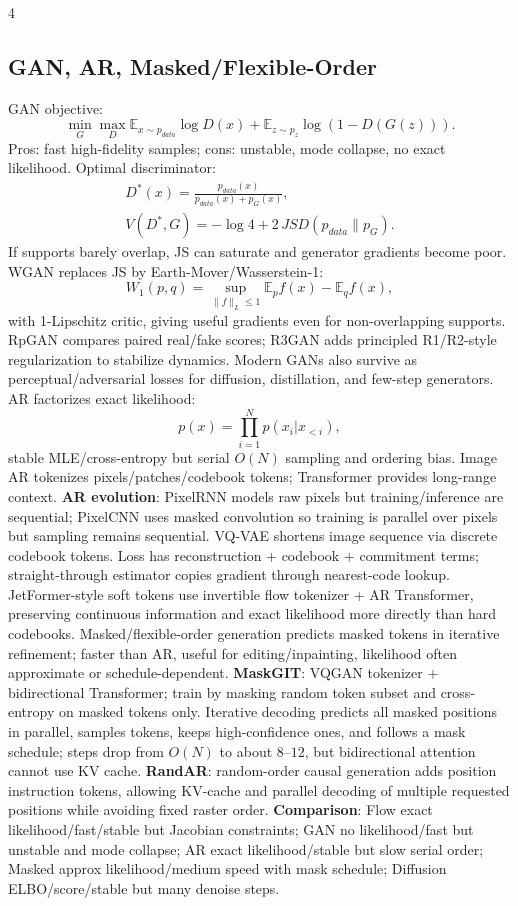 \documentclass[8pt,a4paper,landscape]{extarticle}
\newcommand{\key}[1]{\textbf{#1}}
\newcommand{\E}{\mathbb{E}}
\begin{document}
\begin{multicols*}{4}
\subsection{GAN, AR, Masked/Flexible-Order}
GAN objective:
\[
\min_G\max_D\E_{x\sim p_{data}}\log D(x)+\E_{z\sim p_z}\log(1-D(G(z))).
\]
Pros: fast high-fidelity samples; cons: unstable, mode collapse, no exact likelihood. Optimal discriminator:
\[
\begin{gathered}
D^*(x)=\frac{p_{data}(x)}{p_{data}(x)+p_G(x)},\\
V(D^*,G)=-\log4+2\,JSD(p_{data}\|p_G).
\end{gathered}
\]
If supports barely overlap, JS can saturate and generator gradients become poor. WGAN replaces JS by Earth-Mover/Wasserstein-1:
\[
W_1(p,q)=\sup_{\|f\|_L\le1}\E_p f(x)-\E_q f(x),
\]
with 1-Lipschitz critic, giving useful gradients even for non-overlapping supports. RpGAN compares paired real/fake scores; R3GAN adds principled R1/R2-style regularization to stabilize dynamics. Modern GANs also survive as perceptual/adversarial losses for diffusion, distillation, and few-step generators. AR factorizes exact likelihood:
\[
p(x)=\prod_{i=1}^N p(x_i|x_{<i}),
\]
stable MLE/cross-entropy but serial $O(N)$ sampling and ordering bias. Image AR tokenizes pixels/patches/codebook tokens; Transformer provides long-range context. \key{AR evolution}: PixelRNN models raw pixels but training/inference are sequential; PixelCNN uses masked convolution so training is parallel over pixels but sampling remains sequential. VQ-VAE shortens image sequence via discrete codebook tokens. Loss has reconstruction + codebook + commitment terms; straight-through estimator copies gradient through nearest-code lookup. JetFormer-style soft tokens use invertible flow tokenizer + AR Transformer, preserving continuous information and exact likelihood more directly than hard codebooks.
Masked/flexible-order generation predicts masked tokens in iterative refinement; faster than AR, useful for editing/inpainting, likelihood often approximate or schedule-dependent. \key{MaskGIT}: VQGAN tokenizer + bidirectional Transformer; train by masking random token subset and cross-entropy on masked tokens only. Iterative decoding predicts all masked positions in parallel, samples tokens, keeps high-confidence ones, and follows a mask schedule; steps drop from $O(N)$ to about $8$--$12$, but bidirectional attention cannot use KV cache. \key{RandAR}: random-order causal generation adds position instruction tokens, allowing KV-cache and parallel decoding of multiple requested positions while avoiding fixed raster order. \key{Comparison}: Flow exact likelihood/fast/stable but Jacobian constraints; GAN no likelihood/fast but unstable and mode collapse; AR exact likelihood/stable but slow serial order; Masked approx likelihood/medium speed with mask schedule; Diffusion ELBO/score/stable but many denoise steps.


\end{multicols*}
\end{document}

